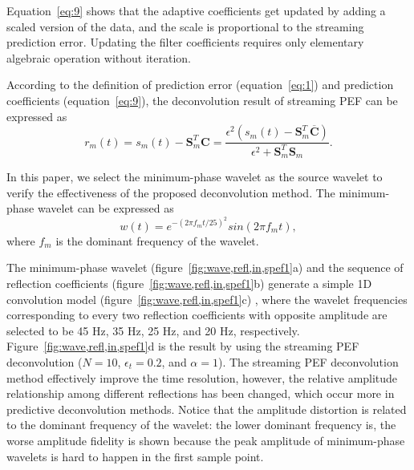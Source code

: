 Equation~\ref{eq:9} shows that the adaptive coefficients get updated by
adding a scaled version of the data, and the scale is proportional to the
streaming prediction error. Updating the filter coefficients requires
only elementary algebraic operation without iteration.

According to the definition of prediction error (equation~\ref{eq:1}) and
prediction coefficients (equation~\ref{eq:9}), the deconvolution result of
streaming PEF can be expressed as
\begin{equation}
  \label{eq:11}
  r_m(t)=s_m(t)-\mathbf{S}_m^T\mathbf{C}=\frac{\epsilon^2(s_m(t)-\mathbf
  {S}_m^T\overline{\mathbf{C}})}{\epsilon^2+\mathbf{S}_m^T\mathbf{S}_m}.
\end{equation}

In this paper, we select the minimum-phase wavelet as the source wavelet
to verify the effectiveness of the proposed deconvolution method. The
minimum-phase wavelet can be expressed as
\begin{equation}
  \label{eq:12}
  w(t)=e^{-(2\pi f_mt/25)^2}sin(2\pi f_mt),
\end{equation}
where $f_m$ is the dominant frequency of the wavelet.

The minimum-phase wavelet (figure~\ref{fig:wave,refl,in,spef1}a) and the
sequence of reflection coefficients (figure~\ref{fig:wave,refl,in,spef1}b)
generate a simple 1D convolution model (figure~\ref{fig:wave,refl,in,spef1}c)
, where the wavelet frequencies corresponding to every two reflection
coefficients with opposite amplitude are selected to be 45 Hz, 35 Hz, 25 Hz,
and 20 Hz, respectively. Figure~\ref{fig:wave,refl,in,spef1}d is the result
by using the streaming PEF deconvolution ($N=10$, $\epsilon_t=0.2$, and
$\alpha=1$). The streaming PEF deconvolution method effectively improve the
time resolution, however, the relative amplitude relationship among
different reflections has been changed, which occur more in predictive
deconvolution methods. Notice that the amplitude distortion is related to
the dominant frequency of the wavelet: the lower dominant frequency is,
the worse amplitude fidelity is shown because the peak amplitude of
minimum-phase wavelets is hard to happen in the first sample point.


